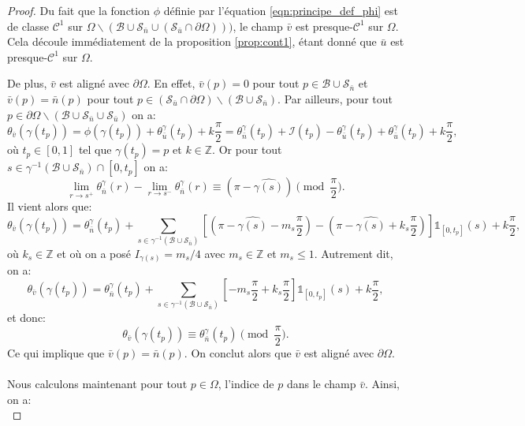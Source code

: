 \begin{proof}
    Du fait que la fonction $\phi$ définie par l'équation \eqref{eqn:principe_def_phi} est de classe $\mathcal{C}^1$ sur $\Omega\backslash(\mathcal{B}\cup\mathcal{S}_{\bar{n}}\cup(\mathcal{S}_{\bar{u}}\cap\partial\Omega)))$, le champ $\bar{v}$ est presque-$\mathcal{C}^1$ sur $\Omega$. Cela découle immédiatement de la proposition \ref{prop:cont1}, étant donné que $\bar{u}$ est presque-$\mathcal{C}^1$ sur $\Omega$.

    De plus, $\bar{v}$ est aligné avec $\partial\Omega$. En effet, $\bar{v}(p)=0$ pour tout $p\in\mathcal{B}\cup\mathcal{S}_{\bar{n}}$ et $\bar{v}(p)=\bar{n}(p)$ pour tout $p\in(\mathcal{S}_{\bar{u}}\cap\partial\Omega)\backslash(\mathcal{B}\cup\mathcal{S}_{\bar{n}})$. Par ailleurs, pour tout $p\in\partial\Omega\backslash(\mathcal{B}\cup\mathcal{S}_{\bar{n}}\cup\mathcal{S}_{\bar{u}})$ on a:
    $$\theta_{\bar{v}}(\gamma(t_p))=\phi(\gamma(t_p))+\theta_{\bar{u}}^\gamma(t_p)+k\frac{\pi}{2}=\theta_{\bar{n}}^\gamma(t_p)+\mathcal{I}(t_p)-\theta_{\bar{u}}^\gamma(t_p)+\theta_{\bar{u}}^\gamma(t_p)+k\frac{\pi}{2},$$
    où $t_p\in[0,1]$ tel que $\gamma(t_p)=p$ et $k\in\mathbb{Z}$. Or pour tout $s\in\gamma^{-1}(\mathcal{B}\cup\mathcal{S}_{\bar{n}})\cap[0, t_p]$ on a:
    $$
    \lim\limits_{r\rightarrow s^+}\theta^{\gamma}_{\bar{n}}(r) - \lim\limits_{r\rightarrow s^-}\theta^{\gamma}_{\bar{n}}(r)\equiv(\pi-\widehat{\gamma(s)})\pmod{\frac{\pi}{2}}.
    $$
    Il vient alors que:
    $$
    \theta_{\bar{v}}(\gamma(t_p))=\theta_{\bar{n}}^{\gamma}(t_p)+\displaystyle\sum_{s\in\gamma^{-1}(\mathcal{B}\cup\mathcal{S}_{\bar{n}})}\left[\left(\pi-\widehat{\gamma(s)}-m_s\frac{\pi}{2}\right)-\left(\pi-\widehat{\gamma(s)}+k_s\frac{\pi}{2}\right)\right]\mathbb{1}_{[0, t_p]}(s)+k\frac{\pi}{2},
    $$
    où $k_s\in\mathbb{Z}$ et où on a posé $I_{\gamma(s)}=m_s/4$ avec $m_s\in\mathbb{Z}$ et $m_s\leq1$. Autrement dit, on a:
    $$
    \theta_{\bar{v}}(\gamma(t_p))=\theta_{\bar{n}}^\gamma(t_p)+\displaystyle\sum_{s\in\gamma^{-1}(\mathcal{B}\cup\mathcal{S}_{\bar{n}})}\left[-m_s\frac{\pi}{2}+k_s\frac{\pi}{2}\right]\mathbb{1}_{[0, t_p]}(s)+k\frac{\pi}{2},$$
    et donc:
    $$
    \theta_{\bar{v}}(\gamma(t_p))\equiv\theta_{\bar{n}}^\gamma(t_p)\pmod{\frac{\pi}{2}}.
    $$
    Ce qui implique que $\bar{v}(p)=\bar{n}(p)$. On conclut alors que $\bar{v}$ est aligné avec $\partial\Omega$.\\\\
    Nous calculons maintenant pour tout $p\in\Omega$, l'indice de $p$ dans le champ $\bar{v}$. Ainsi, on a:\\

\end{proof}
